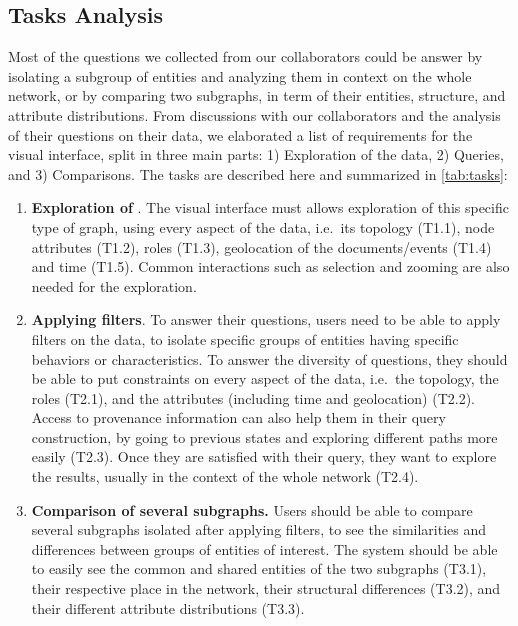 \subsection{Tasks Analysis}

Most of the questions we collected from our collaborators could be answer by isolating a subgroup of entities and analyzing them in context on the whole network, or by comparing two subgraphs, in term of their entities, structure, and attribute distributions. From discussions with our collaborators and the analysis of their questions on their data, we elaborated a list of requirements for the visual interface, split in three main parts: 1) Exploration of the data, 2) Queries, and 3) Comparisons. The tasks are described here and summarized in \autoref{tab:tasks}:

\begin{enumerate}
    \item \textbf{Exploration of \model}. The visual interface must allows exploration of this specific type of graph, using every aspect of the data, i.e.\ its topology (T1.1), node attributes  (T1.2), roles (T1.3), geolocation of the documents/events (T1.4) and time (T1.5). Common interactions such as selection and zooming are also needed for the exploration.
    \item \textbf{Applying filters}. To answer their questions, users need to be able to apply filters on the data, to isolate specific groups of entities having specific behaviors or characteristics. To answer the diversity of questions, they should be able to put constraints on every aspect of the data, i.e.\ the topology, the roles (T2.1), and the attributes (including time and geolocation) (T2.2).
    Access to provenance information can also help them in their query construction, by going to previous states and exploring different paths more easily (T2.3). Once they are satisfied with their query, they want to explore the results, usually in the context of the whole network (T2.4).
    \item \textbf{Comparison of several subgraphs.} Users should be able to compare several subgraphs isolated after applying filters, to see the similarities and differences between groups of entities of interest. The system should be able to easily see the common and shared entities of the two subgraphs (T3.1), their respective place in the network, their structural differences (T3.2), and their different attribute distributions (T3.3).
\end{enumerate}





